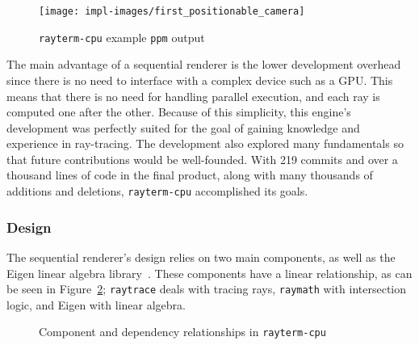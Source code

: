 \vspace{0.3em}
\begin{figure}[htb]
  \centering
  \texttt{[image: impl-images/first\_positionable\_camera]}
  \caption{\texttt{rayterm-cpu} example \texttt{ppm} output}
\label{fig:rayterm-cpu_ppm}
\end{figure}

The main advantage of a sequential renderer is the lower development overhead since there is no need to interface with a complex device such as a GPU.
This means that there is no need for handling parallel execution, and each ray is computed one after the other.
Because of this simplicity, this engine's development was perfectly suited for the goal of gaining knowledge and experience in ray-tracing.
The development also explored many fundamentals so that future contributions would be well-founded.
With 219 commits and over a thousand lines of code in the final product, along with many thousands of additions and deletions, \texttt{rayterm-cpu} accomplished its goals.

\subsubsection{Design}
\label{ch:methods:renderer:sequential:design}

The sequential renderer's design relies on two main components, as well as the Eigen linear algebra library~\cite{eigenweb}.
These components have a linear relationship, as can be seen in Figure~\ref{fig:rayterm-cpu_components}; \texttt{raytrace} deals with tracing rays, \texttt{raymath} with intersection logic, and Eigen with linear algebra.

\vspace{0.3em}
\begin{figure}[htb]
  \centering
  \caption{Component and dependency relationships in \texttt{rayterm-cpu}}
\label{fig:rayterm-cpu_components}
\end{figure}

